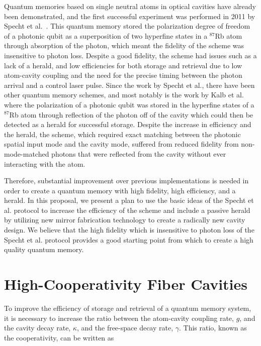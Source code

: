 \documentclass[a4paper]{article}
\begin{document}
Quantum memories based on single neutral atoms in optical cavities have already been demonstrated, and the first successful experiment was performed in 2011 by Specht et al.~\cite{Specht2011}. This quantum memory stored the polarization degree of freedom of a photonic qubit as a superposition of two hyperfine states in a $^{87}$Rb atom through absorption of the photon, which meant the fidelity of the scheme was insensitive to photon loss. Despite a good fidelity, the scheme had issues such as a lack of a herald, and low efficiencies for both storage and retrieval due to low atom-cavity coupling and the need for the precise timing between the photon arrival and a control laser pulse. Since the work by Specht et al., there have been other quantum memory schemes, and most notably is the work by Kalb et al.~\cite{Kalb2015} where the polarization of a photonic qubit was stored in the hyperfine states of a $^{87}$Rb atom through reflection of the photon off of the cavity which could then be detected as a herald for successful storage. Despite the increase in efficiency and the herald, the scheme, which required exact matching between the photonic spatial input mode and the cavity mode, suffered from reduced fidelity from non-mode-matched photons that were reflected from the cavity without ever interacting with the atom. 

Therefore, substantial improvement over previous implementations is needed in order to create a quantum memory with high fidelity, high efficiency, and a herald. In this proposal, we present a plan to use the basic ideas of the Specht et al. protocol to increase the efficiency of the scheme and include a passive herald by utilizing new mirror fabrication technology to create a radically new cavity design. We believe that the high fidelity which is insensitive to photon loss of the Specht et al. protocol provides a good starting point from which to create a high quality quantum memory.

\section{High-Cooperativity Fiber Cavities}

\indent\indent To improve the efficiency of storage and retrieval of a quantum memory system, it is necessary to increase the ratio between the atom-cavity coupling rate, $g$, and the cavity decay rate, $\kappa$, and the free-space decay rate, $\gamma$. This ratio, known as the cooperativity, can be written as~\cite{Hunger2010}
\end{document}

